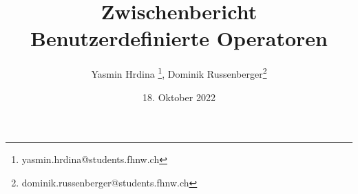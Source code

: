 \documentclass[a4paper, 11pt]{article}
\title {\textrm{Zwischenbericht \\ Benutzerdefinierte Operatoren}}
\author{Yasmin Hrdina \footnote{yasmin.hrdina@students.fhnw.ch}, Dominik Russenberger\footnote{dominik.russenberger@students.fhnw.ch}}
\affil{Fachhochschule Nordwestschweiz}
\date{18. Oktober 2022}
\begin{document}

	\begin{titlepage}
		\maketitle
		\vfill
	\end{titlepage}

	\tableofcontents

	\newpage 


	

	\newpage

	
\end{document}
